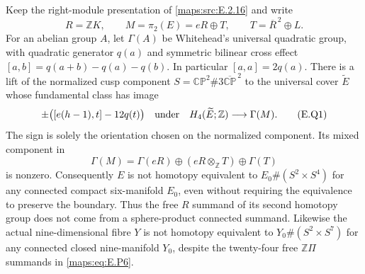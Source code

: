 \begin{proposition}\label{maps:src:E.2.18}


Keep the right-module presentation of \ref{maps:src:E.2.16} and write
\[
 R=\mathbb ZK,\qquad M=\pi_2(E)=eR\oplus T,
 \qquad T=\overline R^{\,2}\oplus L.
\]
For an abelian group $A$, let $\Gamma(A)$ be Whitehead's universal
quadratic group, with quadratic generator $q(a)$ and symmetric
bilinear cross effect
$[a,b]=q(a+b)-q(a)-q(b)$.  In particular $[a,a]=2q(a)$.
There is a lift of the normalized cusp component
$S=\mathbb {CP}^2\#3\overline{\mathbb {CP}}^{\,2}$ to the
universal cover $\widetilde E$ whose fundamental class has image
\[
 \pm\bigl([e(h-1),t]-12q(t)\bigr)
       \quad\hbox{under}\quad
 H_4(\widetilde E;\mathbb Z)\longrightarrow\Gamma(M).
 \tag{E.Q1}\label{maps:eq:E.Q1}
\]
The sign is solely the orientation chosen on the normalized
component.  Its mixed component in
\[
 \Gamma(M)=\Gamma(eR)\oplus(eR\otimes_{\mathbb Z}T)
                                      \oplus\Gamma(T)
 \tag{E.Q2}\label{maps:eq:E.Q2}
\]
is nonzero.  Consequently $E$ is not homotopy equivalent to
$E_0\#(S^2\times S^4)$ for any connected compact six-manifold
$E_0$, even without requiring the equivalence to preserve the
boundary.  Thus the free $R$ summand of its second homotopy group
does not come from a sphere-product connected summand.
Likewise the actual nine-dimensional fibre $Y$ is not
homotopy equivalent to $Y_0\#(S^2\times S^7)$ for any
connected closed nine-manifold $Y_0$, despite the twenty-four
free $\mathbb Z\Pi$ summands in \eqref{maps:eq:E.P6}.

\end{proposition}


